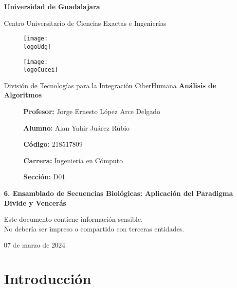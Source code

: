 \documentclass[12pt, a4paper]{article} %
\title{\theTitle}
\author{\theAuthor}
\newcommand{\logoUdg}{../../../../attachments/images/portada-udg.jpeg}
\newcommand{\logoCucei}{../../../../attachments/images/portada-cucei.jpeg}
\newcommand{\materia}{Análisis de Algoritmos}
\newcommand{\theTitle}{6. Ensamblado de Secuencias Biológicas: Aplicación del Paradigma Divide y Vencerás}
\newcommand{\profesor}{Jorge Ernesto López Arce Delgado}
\newcommand{\theAuthor}{Alan Yahir Juárez Rubio}
\newcommand{\code}{218517809}
\newcommand{\carrera}{Ingeniería en Cómputo}
\newcommand{\seccion}{D01}
\newcommand{\startDate}{07 de marzo de 2024}
\newcommand{\nl}{\par\vspace{0.4cm}}
\begin{document}
\cfoot{\thepage} %

\begin{titlepage}
	\centering
	{\huge\textbf{Universidad de Guadalajara}}\par\vspace{0.6cm}
	{\LARGE{Centro Universitario de Ciencias Exactas e Ingenierías}}\vfill
	
	\begin{figure}[h]
		\begin{minipage}[t]{0.45\textwidth}
			\centering
			\texttt{[image: \\logoUdg]}
		\end{minipage}
		\hfill
		\begin{minipage}[t]{0.45\textwidth}
			\centering
			\texttt{[image: \\logoCucei]}
		\end{minipage}
	\end{figure}\vfill
	
	{\Large{División de Tecnologías para la Integración CiberHumana}}\vfill
	{\Large\textbf{\materia}}\vfill
	\begin{figure}[h]
		\centering
		\begin{minipage}[t]{0.75\textwidth}
			{\Large
				\textbf{Profesor:} \profesor\nl
				\textbf{Alumno:} \theAuthor\nl
				\textbf{Código:} \code\nl
				\textbf{Carrera:} \carrera\nl
				\textbf{Sección:} \seccion
			}
		\end{minipage}
	\end{figure}\vfill
	{\LARGE{\textbf{\theTitle}}}\vfill
	
	\begin{tcolorbox}[colback=red!5!white, colframe=red!75!black]
		\centering
		Este documento contiene información sensible.\\
		No debería ser impreso o compartido con terceras entidades.
	\end{tcolorbox}\vfill
	{\large \startDate}\par
\end{titlepage}

\clearpage
\tableofcontents

\clearpage
\listoffigures
	

\clearpage
\section{Introducción}
\end{document}
